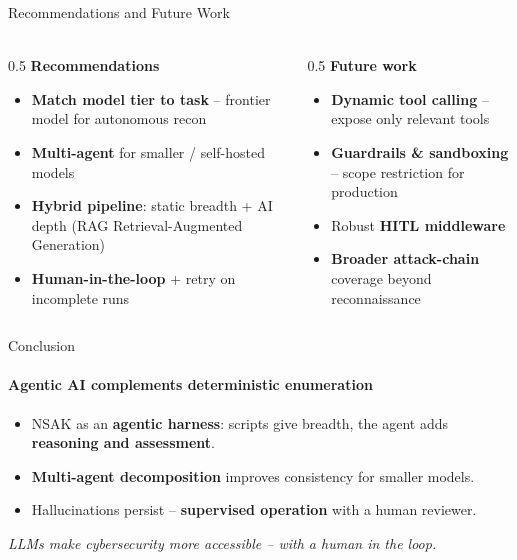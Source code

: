 \begin{frame}{Recommendations and Future Work}
    \framesubtitle{}
    \begin{columns}[T,onlytextwidth]
        \begin{column}{0.5\textwidth}
            \textbf{Recommendations}
            \begin{itemize}
                \item \scriptsize \textbf{Match model tier to task} -- frontier model for autonomous recon
                \item \scriptsize \textbf{Multi-agent} for smaller / self-hosted models
                \item \scriptsize \textbf{Hybrid pipeline}: static breadth + AI depth (RAG Retrieval-Augmented Generation)
                \item \scriptsize \textbf{Human-in-the-loop} + retry on incomplete runs
            \end{itemize}
        \end{column}
        \begin{column}{0.5\textwidth}
            \textbf{Future work}
            \begin{itemize}
                \item \scriptsize \textbf{Dynamic tool calling} -- expose only relevant tools
                \item \scriptsize \textbf{Guardrails \& sandboxing} -- scope restriction for production
                \item \scriptsize Robust \textbf{HITL middleware}
                \item \scriptsize \textbf{Broader attack-chain} coverage beyond reconnaissance
            \end{itemize}
        \end{column}
    \end{columns}
\end{frame}

\begin{frame}{Conclusion}
    \framesubtitle{Agentic AI complements deterministic enumeration}
    \begin{itemize}
        \item[\faCheck] NSAK as an \textbf{agentic harness}: scripts give breadth, the agent adds \textbf{reasoning and assessment}.
        \item[\faCheck] \textbf{Multi-agent decomposition} improves consistency for smaller models.
        \item[\faExclamationTriangle] Hallucinations persist -- \textbf{supervised operation} with a human reviewer.
    \end{itemize}
    \vspace{0.5em}
    \begin{center}
        \footnotesize\textit{LLMs make cybersecurity more accessible -- with a human in the loop.}
    \end{center}
\end{frame}

